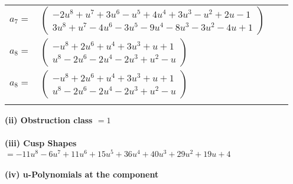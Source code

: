 \documentclass[1p]{elsarticle_modified}
\theoremstyle{definition}
\begin{document}
\begin{tabular}{m{7pt} m{180pt} m{7pt} m{180pt} }
\flushright $a_{7}=$&$\begin{pmatrix}-2 u^8+u^7+3 u^6- u^5+4 u^4+3 u^3- u^2+2 u-1\\3 u^8+u^7-4 u^6-3 u^5-9 u^4-8 u^3-3 u^2-4 u+1\end{pmatrix}$ \\
\flushright $a_{8}=$&$\begin{pmatrix}- u^8+2 u^6+u^4+3 u^3+u+1\\u^8-2 u^6-2 u^4-2 u^3+u^2- u\end{pmatrix}$\\ \flushright $a_{8}=$&$\begin{pmatrix}- u^8+2 u^6+u^4+3 u^3+u+1\\u^8-2 u^6-2 u^4-2 u^3+u^2- u\end{pmatrix}$\\&\end{tabular}
\flushleft \textbf{(ii) Obstruction class $= 1$}\\~\\
\flushleft \textbf{(iii) Cusp Shapes $= -11 u^8-6 u^7+11 u^6+15 u^5+36 u^4+40 u^3+29 u^2+19 u+4$}\\~\\
\newpage\renewcommand{\arraystretch}{1}
\flushleft \textbf{(iv) u-Polynomials at the component}\newline \\
\end{document}
